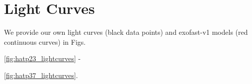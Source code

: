 \documentclass[a4paper,fleqn,usenatbib]{mnras}
\begin{document}






\newpage
\appendix
\section{Light Curves}
\label{sec:appendixa}

We provide our own light curves (black data points) and {\sc exofast}-v1 models (red continuous curves) in Figs.{\ref{fig:hatp23_lightcurves} - {\ref{fig:hatp37_lightcurves}.

  
}}
\end{document}
